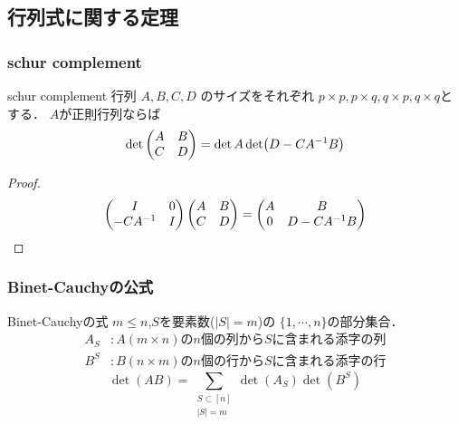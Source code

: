 \subsection{行列式に関する定理}
\subsubsection{schur complement}
\begin{itembox}[l]{schur complement}
行列 $A, B, C, D$ のサイズをそれぞれ
$p\times p, p\times q, q \times p, q \times q$とする．
$A$が正則行列ならば
\begin{equation}
 \det\begin{pmatrix} A & B \\ C & D \end{pmatrix}=\det A\det (D-C{A}^{-1}B)
\end{equation}
\end{itembox}
\begin{proof}
\begin{equation}
  \begin{pmatrix} I & 0 \\ -C{A}^{-1} & I \end{pmatrix}\begin{pmatrix} A & B \\ C & D \end{pmatrix}=\begin{pmatrix} A & B \\ 0 & D-C{A}^{-1}B \end{pmatrix}
\end{equation}
\end{proof}
\subsubsection{Binet-Cauchyの公式}
\begin{itembox}[l]{Binet-Cauchyの式}
$m\leq n$,$S$を要素数($|S| = m$)の
$\{1,\cdots,n\}$の部分集合．
\begin{align}
    A_S &:\text{$A(m\times n)$の$n$個の列から$S$に含まれる添字の列}\\
    B^S &:\text{$B(n \times m)$の$n$個の行から$S$に含まれる添字の行}
\end{align}
\begin{equation}
    \det(AB) = \sum_{\substack{S \subset [n]\\
    |S| = m}} \det(A_S) \det(B^S)
\end{equation}
\end{itembox}
